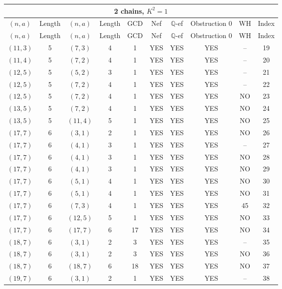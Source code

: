 \begin{longtable}{|c|c|c|c|c|c|c|c|c|c|}
\hline
\multicolumn{10}{|c|}{2 chains, $K^2 = 1$}\\
\hline
$(n,a)$ & Length & $(n,a)$ & Length & GCD & Nef & $\mathbb Q$-ef & Obstruction 0 & WH & Index\\
\hline
\endfirsthead

\hline
$(n,a)$ & Length & $(n,a)$ & Length & GCD & Nef & $\mathbb Q$-ef & Obstruction 0 & WH & Index\\
\hline
\endhead
\hline
\endfoot

$(11, 3)$ & 5 & $(7, 3)$ & 4 & 1 & YES & YES & YES & -- & 19\\
$(11, 4)$ & 5 & $(7, 2)$ & 4 & 1 & YES & YES & YES & -- & 20\\
$(12, 5)$ & 5 & $(5, 2)$ & 3 & 1 & YES & YES & YES & -- & 21\\
$(12, 5)$ & 5 & $(7, 2)$ & 4 & 1 & YES & YES & YES & -- & 22\\
$(12, 5)$ & 5 & $(7, 2)$ & 4 & 1 & YES & YES & YES & NO & 23\\
$(13, 5)$ & 5 & $(7, 2)$ & 4 & 1 & YES & YES & YES & NO & 24\\
$(13, 5)$ & 5 & $(11, 4)$ & 5 & 1 & YES & YES & YES & NO & 25\\
$(17, 7)$ & 6 & $(3, 1)$ & 2 & 1 & YES & YES & YES & NO & 26\\
$(17, 7)$ & 6 & $(4, 1)$ & 3 & 1 & YES & YES & YES & -- & 27\\
$(17, 7)$ & 6 & $(4, 1)$ & 3 & 1 & YES & YES & YES & NO & 28\\
$(17, 7)$ & 6 & $(4, 1)$ & 3 & 1 & YES & YES & YES & NO & 29\\
$(17, 7)$ & 6 & $(5, 1)$ & 4 & 1 & YES & YES & YES & NO & 30\\
$(17, 7)$ & 6 & $(5, 1)$ & 4 & 1 & YES & YES & YES & NO & 31\\
$(17, 7)$ & 6 & $(7, 3)$ & 4 & 1 & YES & YES & YES & 45 & 32\\
$(17, 7)$ & 6 & $(12, 5)$ & 5 & 1 & YES & YES & YES & NO & 33\\
$(17, 7)$ & 6 & $(17, 7)$ & 6 & 17 & YES & YES & YES & NO & 34\\
$(18, 7)$ & 6 & $(3, 1)$ & 2 & 3 & YES & YES & YES & -- & 35\\
$(18, 7)$ & 6 & $(3, 1)$ & 2 & 3 & YES & YES & YES & NO & 36\\
$(18, 7)$ & 6 & $(18, 7)$ & 6 & 18 & YES & YES & YES & NO & 37\\
$(19, 7)$ & 6 & $(3, 1)$ & 2 & 1 & YES & YES & YES & -- & 38\\

\end{longtable}

